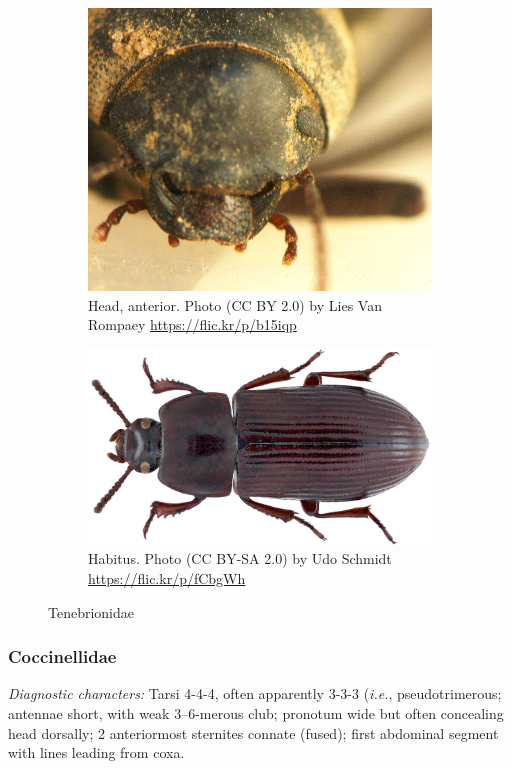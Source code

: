 \documentclass[letterpaper, 11pt]{article}
\begin{document}
\begin{figure}[ht!]
  \centering
\begin{subfigure}[ht!]{0.35\textwidth}
    \includegraphics[width=\textwidth]{TenebrionidHead}
  \caption{Head, anterior. Photo (CC BY 2.0) by Lies Van Rompaey \url{https://flic.kr/p/b15iqp}}
  \label{fig:tenebrionid1}
\end{subfigure}
    \qquad
\begin{subfigure}[ht!]{0.5\textwidth}
    \includegraphics[width=\textwidth]{TenebrionidHabitus}
  \caption{Habitus. Photo (CC BY-SA 2.0) by Udo Schmidt \url{https://flic.kr/p/fCbgWh}}
  \label{fig:tenebrionid2}
\end{subfigure}
    \caption{Tenebrionidae}\label{fig:tenebrionids}
\end{figure}

\subsubsection{Coccinellidae}
\noindent{}\textit{Diagnostic characters:} Tarsi 4-4-4, often apparently 3-3-3 (\textit{i.e.}, pseudotrimerous; antennae short, with weak 3--6-merous club; pronotum wide but often concealing head dorsally; 2 anteriormost sternites connate (fused); first abdominal segment with lines leading from coxa.\\
\end{document}
